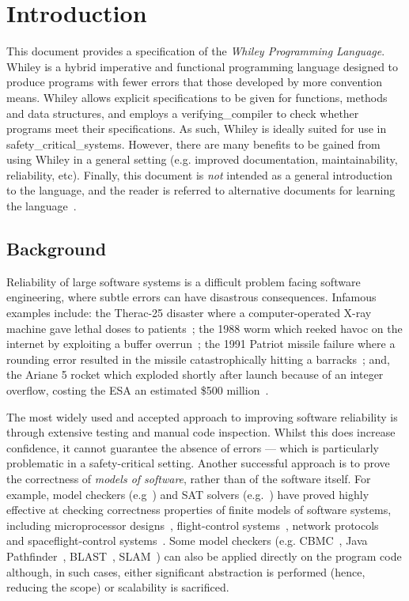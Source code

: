 \chapter{Introduction}

This document provides a specification of the {\em Whiley Programming
  Language}.  Whiley is a hybrid imperative and functional programming
language designed to produce programs with fewer errors that those
developed by more convention means.  Whiley allows explicit
specifications to be given for functions, methods and data structures,
and employs a \gls{verifying_compiler} to check whether programs meet their specifications.  As such, Whiley is ideally suited
for use in \gls{safety_critical_system}s.  However, there are many
benefits to be gained from using Whiley in a general setting
(e.g. improved documentation, maintainability, reliability, etc).
Finally, this document is {\em not} intended as a general introduction
to the language, and the reader is referred to alternative documents
for learning the language~\cite{X}.


\section{Background}

Reliability of large software systems is a difficult problem facing
software engineering, where subtle errors can have disastrous
consequences.  Infamous examples include: the Therac-25 disaster where
a computer-operated X-ray machine gave lethal doses to
patients~\cite{LT93}; the 1988 worm which reeked havoc on the internet
by exploiting a buffer overrun~\cite{ER89}; the 1991 Patriot missile
failure where a rounding error resulted in the missile catastrophically
hitting a barracks~\cite{GAO}; and, the Ariane 5 rocket which exploded
shortly after launch because of an integer overflow, costing the ESA
an estimated \$500 million~\cite{ARIAN5}.

The most widely used and accepted approach to improving software
reliability is through extensive testing and manual code inspection.
Whilst this does increase confidence, it cannot guarantee the absence
of errors --- which is particularly problematic in a safety-critical
setting.  Another successful approach is to prove the correctness of
{\em models of software}, rather than of the software itself.  For
example, model checkers
(e.g~\cite{Clarke99,Holz01,BR02}) and SAT solvers %
(e.g.~\cite{MMZZM01,MFM04}) have proved highly %
effective at checking correctness properties of finite models of
software systems, including microprocessor
designs~\cite{VB03,Schub03}, flight-control
systems~\cite{GH02,Choi05}, network protocols~\cite{Boli98,AC03} and
spaceflight-control systems~\cite{HP00b}.  Some model checkers %
(e.g. CBMC~\cite{CKL04}, Java Pathfinder~\cite{HP00b},
BLAST~\cite{HJMS03}, SLAM~\cite{BMMR01}) can also be applied directly
on the program code although, in such cases, either significant
abstraction is performed (hence, reducing the scope) or scalability is
sacrificed.

